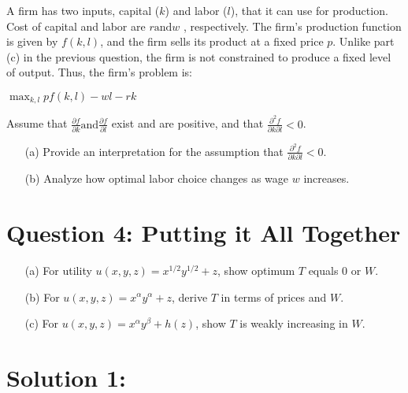 \documentclass[10pt, a4paper]{article}
\begin{document}
A firm has two inputs, capital ($k$) and labor ($l$), that it can use for production. Cost of capital and labor are $r \text{and} w$ , respectively. The firm's production function is 
given by $f(k, l)$, and the firm sells its product at a fixed price $p$. Unlike part (c) in the previous question, the firm is not constrained to produce a fixed level of output.
Thus, the firm's problem is:
\begin{center}
    $\max_{k,l} pf(k,l) - wl - rk$
\end{center}
Assume that $\frac{\partial f}{\partial k} \text{and} \frac{\partial f}{\partial l}$ exist and are positive, and that $\frac{\partial^2 f}{\partial k\partial l} < 0$.
\begin{enumerate}
    \item[(a)] Provide an interpretation for the assumption that $\frac{\partial^2 f}{\partial k\partial l} < 0$.
    \item[(b)] Analyze how optimal labor choice changes as wage $w$ increases.
\end{enumerate}

\section*{Question 4: Putting it All Together}

\begin{enumerate}
    \item[(a)] For utility $u(x, y, z) = x^{1/2} y^{1/2} + z$, show optimum $T$ equals 0 or $W$.
    \item[(b)] For $u(x, y, z) = x^\alpha y^\alpha + z$, derive $T$ in terms of prices and $W$.
    \item[(c)] For $u(x, y, z) = x^\alpha y^\beta + h(z)$, show $T$ is weakly increasing in $W$.
\end{enumerate}

\section*{Solution 1:}
\end{document}
